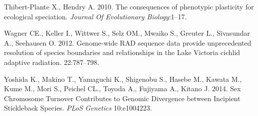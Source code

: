 \documentclass[]{article}
\begin{document}
\leavevmode\hypertarget{ref-ThibertPlante:2010vw}{}%
Thibert-Plante X., Hendry A. 2010. The consequences of phenotypic
plasticity for ecological speciation. \emph{Journal Of Evolutionary
Biology}:1--17.

\leavevmode\hypertarget{ref-Wagner:2012hw}{}%
Wagner CE., Keller I., Wittwer S., Selz OM., Mwaiko S., Greuter L.,
Sivasundar A., Seehausen O. 2012. Genome-wide RAD sequence data provide
unprecedented resolution of species boundaries and relationships in the
Lake Victoria cichlid adaptive radiation. 22:787--798.

\leavevmode\hypertarget{ref-Yoshida:2014bn}{}%
Yoshida K., Makino T., Yamaguchi K., Shigenobu S., Hasebe M., Kawata M.,
Kume M., Mori S., Peichel CL., Toyoda A., Fujiyama A., Kitano J. 2014.
Sex Chromosome Turnover Contributes to Genomic Divergence between
Incipient Stickleback Species. \emph{PLoS Genetics} 10:e1004223.
\end{document}
